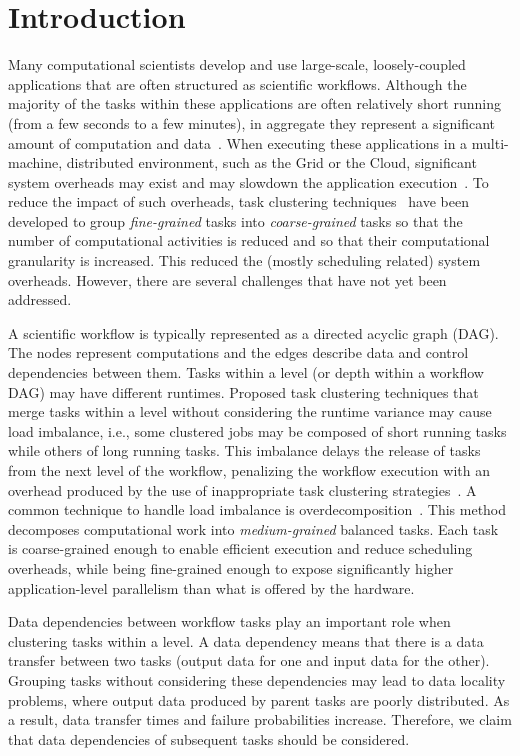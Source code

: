 
\section{Introduction}
\label{intro}
Many computational scientists develop and use large-scale, loosely-coupled applications that are often structured as scientific workflows. Although the majority of the tasks within these applications are often relatively short running (from a few seconds to a few minutes), in aggregate they represent a significant amount of computation and data~\cite{daSilva:2013:TFO:2534248.2534254,Juve2013}. When executing these applications in a multi-machine{, }distributed environment, such as the Grid or the Cloud, significant system overheads may exist and may slowdown the application {execution}~\cite{Chen2011}. To reduce the impact of such overheads, task clustering techniques~\cite{Muthuvelu:2005:DJG:1082290.1082297,4493929,Muthuvelu2010,Muthuvelu2013170,keat-2006,ang-2009,Liu2009,Singh:2008:WTC:1341811.1341822,Ferreira-granularity-2013} have been developed to group \emph{fine-grained} tasks into \emph{coarse-grained} tasks so that the number of computational activities is reduced and {so that }their computational granularity is increased{.  This reduced }the (mostly scheduling related) system overheads.
However, there are several challenges that have not yet been addressed.

A scientific workflow is typically represented as a directed acyclic graph (DAG). {The nodes represent computations and the edges describe data and control dependencies between them. }Tasks within a level (or depth within a workflow DAG) may have different runtimes. {Proposed task clustering techniques that merge  }tasks within a level without considering the runtime variance may cause load imbalance, i.e., some clustered jobs may be composed of short running tasks while others of long running tasks. This imbalance delays the release of tasks from the next level of the workflow, penalizing the workflow execution with an overhead produced by the use of inappropriate task clustering strategies~\cite{Chen2013}.
A common technique to handle load imbalance is overdecomposition~\cite{Lifflander}.
This method decomposes computational work into \emph{medium-grained} balanced tasks. Each task is coarse-grained enough to enable efficient execution and reduce scheduling overheads, while being fine-grained enough to expose significantly higher application-level parallelism than what is offered by the hardware. 

Data dependencies between workflow tasks play an important role when clustering tasks within a level. A data dependency means that there is a data transfer between two tasks (output data for one and input data for the other). Grouping tasks without considering these dependencies may lead to data locality problems{, }where output data produced by parent tasks are poorly distributed. As a result, data transfer times and failure probabilities increase.
Therefore, we claim that data dependencies of subsequent tasks should be considered.

